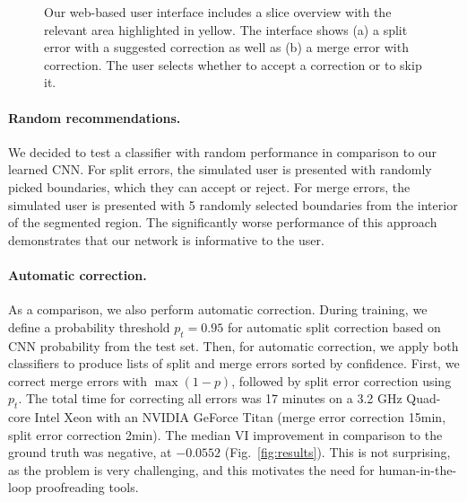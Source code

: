 \begin{figure}[t]
 \centering
    \hfill
	\caption{Our web-based user interface includes a slice overview with the relevant area highlighted in yellow. The interface shows (a) a split error with a suggested correction as well as (b) a merge error with correction. The user selects whether to accept a correction or to skip it.}
	\vspace{-0.4cm}
\end{figure}

\paragraph{Random recommendations.} We decided to test a classifier with random performance in comparison to our learned CNN. For split errors, the simulated user is presented with randomly picked boundaries, which they can accept or reject. For merge errors, the simulated user is presented with 5 randomly selected boundaries from the interior of the segmented region. The significantly worse performance of this approach demonstrates that our network is informative to the user.

\paragraph{Automatic correction.} As a comparison, we also perform automatic correction. During training, we define a probability threshold $p_t=0.95$ for automatic split correction based on CNN probability from the test set. Then, for automatic correction, we apply both classifiers to produce lists of split and merge errors sorted by confidence. First, we correct merge errors with $\max(1-p)$, followed by split error correction using $p_t$. The total time for correcting all errors was 17 minutes on a 3.2 GHz Quad-core Intel Xeon with an NVIDIA GeForce Titan (merge error correction 15min, split error correction 2min). The median VI improvement in comparison to the ground truth was negative, at $-0.0552$ (Fig.~\ref{fig:results}). This is not surprising, as the problem is very challenging, and this motivates the need for human-in-the-loop proofreading tools.

